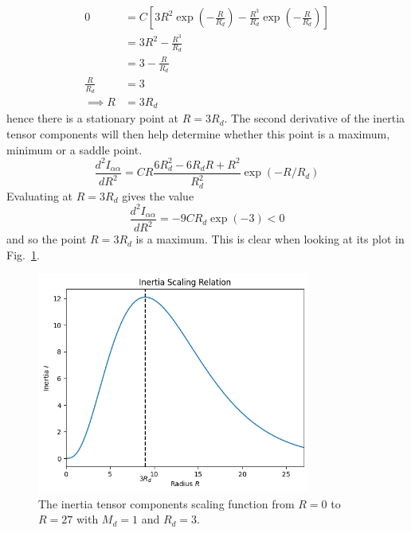 \begin{align}
    0             & = C\left[3R^2 \exp\left(-\frac{R}{R_d}\right) - \frac{R^3}{R_d} \exp\left(-\frac{R}{R_d}\right)\right] \nonumber \\
                  & = 3R^2 - \frac{R^3}{R_d} \nonumber                                                                               \\
                  & = 3 - \frac{R}{R_d} \nonumber                                                                                    \\
    \frac{R}{R_d} & = 3 \nonumber                                                                                                    \\
    \implies R    & = 3R_d
\end{align}
hence there is a stationary point at \( R = 3R_d \). The second derivative of the inertia tensor components will then help
determine whether this point is a maximum, minimum or a saddle point.
\begin{equation}
    \frac{d^2I_{\alpha\alpha}}{dR^2} = CR\frac{6R_d^2 - 6R_d R + R^2}{R_d^2} \exp\left(-R/R_d\right)
\end{equation}
Evaluating at \( R = 3R_d \) gives the value
\begin{equation}
    \frac{d^2I_{\alpha\alpha}}{dR^2} = -9CR_d\exp(-3) < 0
\end{equation}
and so the point \( R=3R_d \) is a maximum. This is clear when looking at its plot in Fig.~\ref{fig:inertia_radius_scaling}.

\begin{figure}
    \begin{center}
        \includegraphics[width=0.8\textwidth]{resources/ring_inertia_scaling.png}
        \caption{The inertia tensor components scaling function from \( R = 0 \) to \( R=27 \) with \( M_d = 1 \) and \( R_d = 3 \).}\label{fig:inertia_radius_scaling}
    \end{center}
\end{figure}

